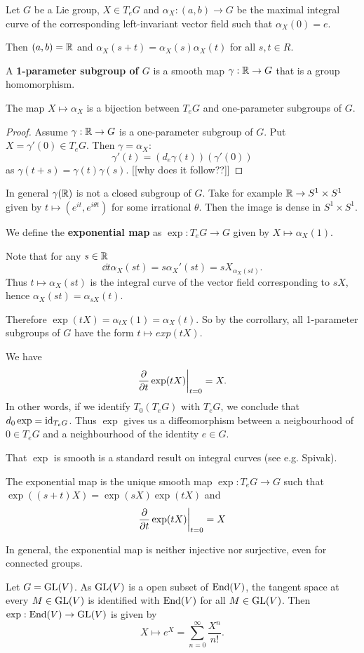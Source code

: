 \documentclass[11pt, english]{article}
\begin{document}
\begin{prop}
 Let $G$ be a Lie group, $X \in T_eG$ and $\alpha_X:(a,b) \to G$ be the maximal integral curve of the corresponding left-invariant vector field such that $\alpha_X(0)=e$.

Then $(a,b)=\mathbb{R}$ and $\alpha_X(s+t) = \alpha_X(s)\alpha_X(t)$ for all $s,t \in R$.
\end{prop}

A \textbf{1-parameter subgroup of $G$} is a smooth map $\gamma:\mathbb{R} \to G$ that is a group homomorphism.

\begin{corr}
 The map $X \mapsto \alpha_X$ is a bijection between $T_eG$ and one-parameter subgroups of $G$.
\end{corr}
\begin{proof}
 Assume $\gamma:\mathbb{R} \to G$ is a one-parameter subgroup of $G$. Put $X = \gamma'(0) \in T_eG$. Then $\gamma = \alpha_X$:
$$
\gamma'(t) = (d_e \gamma(t))(\gamma'(0))
$$
as $\gamma(t+s)=\gamma(t)\gamma(s)$. [[why does it follow??]]
\end{proof}

\begin{remark}
 In general $\gamma(\mathbb{R})$ is not a closed subgroup of $G$. Take for example $\mathbb{R} \to S^1 \times S^1$ given by $t \mapsto (e^{it},e^{i\theta t})$ for some irrational $\theta$. Then the image is dense in $S^1 \times S^1$.
\end{remark}

We define the \textbf{exponential map} as $\exp:T_e G \to G$ given by $X \mapsto \alpha_X(1)$. 

Note that for any $s \in \mathbb{R}$
$$
\dd{}{t} \alpha_X (st) = s \alpha_X'(st) = s X_{\alpha_X(st)}.
$$
Thus $t \mapsto \alpha_X(st)$ is the integral curve of the vector field corresponding to $sX$, hence $\alpha_X(st)= \alpha_{sX}(t)$. 

Therefore $\exp(tX)=\alpha_{tX}(1) = \alpha_X(t)$. So by the corrollary, all 1-parameter subgroups of $G$ have the form $t \mapsto exp(tX)$. 

We have
$$
\restr{\dd{}{t} \exp(tX)}{t=0} = X.
$$
In other words, if we identify $T_0(T_eG)$ with $T_eG$, we conclude that $d_0 \exp = \text{id}_{T_eG}$. Thus $\exp$ gives us a diffeomorphism between a neigbourhood of $0 \in T_eG$ and a neighbourhood of the identity $e \in G$.

That $\exp$ is smooth is a standard result on integral curves (see e.g. Spivak).

\begin{thm}
  The exponential map is the unique smooth map $\exp:T_eG \to G$ such that $\exp((s+t)X) = \exp(sX)\exp(tX)$ and
$$
\restr{\dd{}{t} \exp(tX)}{t=0}=X
$$
\end{thm}
In general, the exponential map is neither injective nor surjective, even for connected groups.
\begin{example}
Let $G = \operatorname{GL}(V)$. As $\operatorname{GL}(V)$ is a open subset of $\operatorname{End}(V)$, the tangent space at every $M \in \operatorname{GL}(V)$ is identified with $\operatorname{End}(V)$ for all $M \in \operatorname{GL}(V)$. Then $\exp:\operatorname{End}(V) \to \operatorname{GL}(V)$ is given by 
$$
X \mapsto e^X = \sum_{n=0}^\infty \frac{X^n}{n!}.
$$
\end{example}
\end{document}
